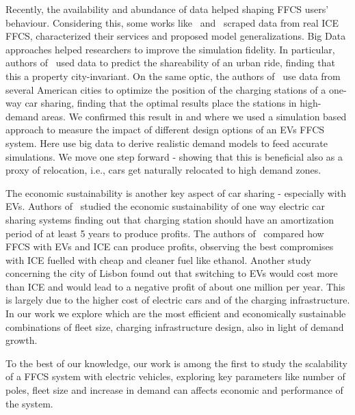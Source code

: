 Recently, the availability and abundance of data helped shaping FFCS users' behaviour.  Considering this, some works like~\cite{9_habibi2017comparison} and~\cite{10_ciociola2017umap} scraped data from real ICE FFCS, characterized their services and proposed model generalizations. %
Big Data approaches helped researchers to improve the simulation fidelity. In particular, authors of~\cite{0_tachet2017scaling} used data to predict the shareability of an urban ride, finding that this a property city-invariant.  %
On the same optic, the authors of~\cite{22_li2016design} use data from several American cities to optimize the position of the charging stations of a one-way car sharing, finding that  the optimal  results place the stations in high-demand areas.  
We confirmed this result in \cite{7_cocca2019free} and \cite{8_cocca2019free} where we used a simulation based approach to measure the impact of different design options of an EVs FFCS system. %
Here use big data to derive realistic demand models to feed accurate simulations. We move one step forward - showing that this is beneficial also as a proxy of relocation, i.e., cars get naturally relocated to high demand zones.

The economic sustainability is another key aspect of car sharing - especially with EVs. Authors of~\cite{20_hua2019joint} studied the economic sustainability of one way electric car sharing systems finding out that charging station should have an amortization period of at least 5 years to produce profits.
The authors of~\cite{19_lemme2019optimization} compared how FFCS with EVs and ICE can produce profits, observing the best compromises with ICE fuelled with cheap and cleaner fuel like ethanol. 
Another study~\cite{21_vasconcelos2017financial} concerning the city of Lisbon found out that switching to EVs would cost more than ICE and would lead to a negative profit of about one million per year. This is largely due to the higher cost of electric cars and of the charging infrastructure.
In our work we explore which are the most efficient and economically sustainable combinations of fleet size, charging infrastructure design, also in light of demand growth.

To the best of our knowledge, our work is among the first to study the scalability of a FFCS system with electric vehicles, exploring key parameters like number of poles, fleet size and increase in demand can affects economic and performance of the system.


